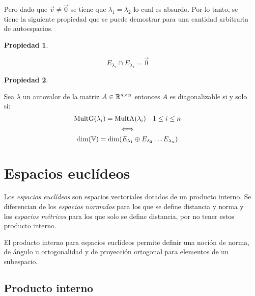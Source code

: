 \documentclass[a5paper,12pt,twoside]{book}
\newtheorem{prop}{{Propiedad}}[chapter]
\begin{document}
Pero dado que $\Vec{v}\neq\Vec{0}$ se tiene que $\lambda_1=\lambda_2$ lo cual es absurdo. Por lo tanto, se tiene la siguiente propiedad que se puede demostrar para una cantidad arbitraria de autoespacios.

\begin{mdframed}[style=MyFrame1]
    \begin{prop}
    \end{prop}
    \begin{equation*}
        E_{\lambda_1} \cap E_{\lambda_1} = \Vec{0}
    \end{equation*}
\end{mdframed}

\begin{mdframed}[style=MyFrame1]
    \begin{prop}
    \end{prop}
    Sea $\lambda$ un autovalor de la matriz $A\in\mathbb{R}^{n\times n}$ entonces $A$ es diagonalizable si y solo si:
    \begin{gather*}
        \operatorname{MultG} (\lambda_i) = \operatorname{MultA} (\lambda_i) \quad 1\leq i\leq n
        \\
        \iff
        \\
        \operatorname{dim}(\mathbb{V}) = \operatorname{dim}(E_{\lambda_1} \oplus E_{\lambda_2} \dots E_{\lambda_n})
    \end{gather*}
\end{mdframed}


\chapter{Espacios euclídeos}

Los \emph{espacios euclídeos} son espacios vectoriales dotados de un producto interno. Se diferencian de los \emph{espacios normados} para los que se define distancia y norma y los \emph{espacios métricos} para los que solo se define distancia, por no tener estos producto interno.

El producto interno para espacios euclídeos permite definir una noción de norma, de ángulo u ortogonalidad y de proyección ortogonal para elementos de un subespacio.


\section{Producto interno}
\end{document}
